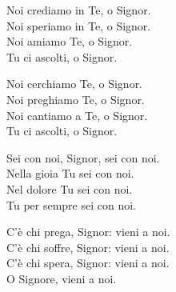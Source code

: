 
\strofa Noi crediamo in Te, o Signor.\\
Noi speriamo in Te, o Signor.\\
Noi amiamo Te, o Signor.\\
Tu ci ascolti, o Signor.

\spazio

\strofa Noi cerchiamo Te, o Signor.\\
Noi preghiamo Te, o Signor.\\
Noi cantiamo a Te, o Signor.\\
Tu ci ascolti, o Signor.

\spazio

\strofa Sei con noi, Signor, sei con noi.\\
Nella gioia Tu sei con noi.\\
Nel dolore Tu sei con noi.\\
Tu per sempre sei con noi.

\spazio

\strofa C'è chi prega, Signor: vieni a noi.\\
C'è chi soffre, Signor: vieni a noi.\\
C'è chi spera, Signor: vieni a noi.\\
O Signore, vieni a noi.